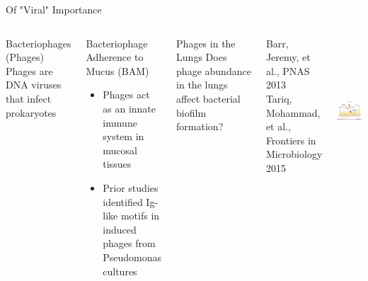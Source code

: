 \documentclass[11pt]{beamer}
\begin{document}
	
	\begin{frame}{Of "Viral" Importance}
	\begin{columns}
	
	\begin{block}{Bacteriophages (Phages)}
	Phages are DNA viruses that infect prokaryotes
	\end{block}
	
	\begin{block}{Bacteriophage Adherence to Mucus (BAM)}
	\begin{itemize}
	\item \alert{Phages act as an innate immune system in mucosal tissues}
	\item Prior studies identified Ig-like motifs in induced phages from Pseudomonas cultures
	\end{itemize}
	\end{block}
	\vspace{-0.3cm}
	\begin{block}{Phages in the Lungs}
	Does phage abundance in the lungs affect bacterial biofilm formation?
	\end{block}
	\vspace{0.2cm}
	\tiny{ Barr, Jeremy, et al., PNAS 2013 \\ Tariq, Mohammad, et al., Frontiers in Microbiology 2015}
	
	\includegraphics[height=5.5cm, width=5cm]{barr.png}
	\end{columns}

	
	
	
	\end{frame}
	
\end{document}
